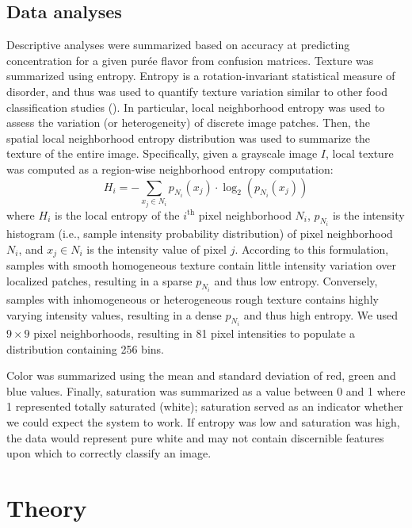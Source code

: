 \documentclass[authoryear]{elsarticle}
\begin{document}
\subsection{Data analyses}\label{ssec:Data analyses}
Descriptive analyses were summarized based on accuracy at predicting concentration for a given pur\' ee flavor from confusion matrices. Texture was summarized using entropy. Entropy is a rotation-invariant statistical measure of disorder, and thus was used to quantify texture variation similar to other food classification studies (\cite{bosch2011, zhu2011}). In particular, local neighborhood entropy was used to assess the variation (or heterogeneity) of discrete image patches. Then, the spatial local neighborhood entropy distribution was used to summarize the texture of the entire image. Specifically, given a grayscale image $I$, local texture was computed as a region-wise neighborhood entropy computation:
\begin{equation}
H_i = -\sum_{x_j \in N_i} p_{N_i}(x_j) \cdot \log_2 (p_{N_i}(x_j))
\end{equation}
where $H_i$ is the local entropy of the $i^{\text{th}}$ pixel neighborhood $N_i$, $p_{N_i}$ is the intensity histogram (i.e., sample intensity probability distribution) of pixel neighborhood $N_i$, and $x_j \in N_i$ is the intensity value of pixel $j$. According to this formulation, samples with smooth homogeneous texture contain little intensity variation over localized patches, resulting in a sparse $p_{N_i}$ and thus low entropy. Conversely, samples with inhomogeneous or heterogeneous rough texture contains highly varying intensity values, resulting in a dense $p_{N_i}$ and thus high entropy. We used $9 \times 9$ pixel neighborhoods, resulting in 81 pixel intensities to populate a distribution containing 256 bins.

Color was summarized using the mean and standard deviation of red, green and blue values. Finally, saturation was summarized as a value between 0 and 1 where 1 represented totally saturated (white); saturation served as an indicator whether we could expect the system to work. If entropy was low and saturation was high, the data would represent pure white and may not contain discernible features upon which to correctly classify an image.


\section{Theory}
\label{sec:Theory}
\end{document}
